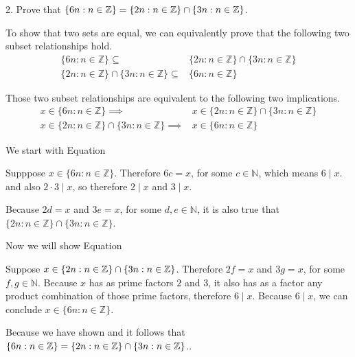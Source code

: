 \documentclass[openany, 12pt]{book}
\begin{document}
\begin{exercise}{}{}{2. Prove that $\{6 n: n \in \mathbb{Z}\}=\{2 n: n \in
				\mathbb{Z}\} \cap\{3 n: n \in \mathbb{Z}\}$.}
	\begin{alist}
		\item To show that two sets are equal, we can equivalently prove that the following two subset
		relationships hold.
		\begin{align}
			\{6n: n \in \mathbb{Z}\}
			\subseteq &
			\{2n: n \in \mathbb{Z}\} \cap \{3n: n \in \mathbb{Z}\} \\
			\{2n: n \in \mathbb{Z}\} \cap \{3n: n \in \mathbb{Z}\}
			\subseteq &
			\{6n: n \in \mathbb{Z}\}
		\end{align}
		\item Those two subset relationships are equivalent to the following two
		implications.
		\begin{align}
			x \in \{6n: n \in \mathbb{Z}\}
			\implies &
			x \in \{2n: n \in \mathbb{Z}\} \cap \{3n: n \in \mathbb{Z}\} \\
			x \in \{2n: n \in \mathbb{Z}\} \cap \{3n: n \in \mathbb{Z}\}
			\implies &
			x \in \{6n: n \in \mathbb{Z}\}
		\end{align}

		We start with Equation
		\item Supppose $x \in \{6n: n \in \mathbb{Z}\}$. Therefore $6c = x$, for some
		$c\in\mathbb{N}$, which means $6\mid x.$ and also $2\cdot3\mid x$, so
		therefore $2\mid x$ and $3\mid x$.
		\item Because $2d=x$ and $3e=x$, for some $d, e \in \mathbb{N}$,
		it is also true that $\{2n: n \in \mathbb{Z}\} \cap \{3n: n \in \mathbb{Z}\}$.

		Now we will show Equation
		\item Suppose $x \in \{2n: n \in \mathbb{Z}\} \cap \{3n: n \in
				\mathbb{Z}\}$. Therefore $2f=x$ and $3g=x$, for some $f, g \in \mathbb{N}$.
		Because $x$ has as prime factors $2$ and $3$, it also has as a factor any
		product combination of those prime factors, therefore $6\mid x$. Because
		$6\mid x$, we can conclude $x \in \{6n: n \in \mathbb{Z}\}$.
		\item Because we have shown and it follows that
		$\{6 n: n \in \mathbb{Z}\}=\{2 n: n \in \mathbb{Z}\} \cap\{3 n: n \in
				\mathbb{Z}\}$..
	\end{alist}
\end{exercise}
\end{document}

